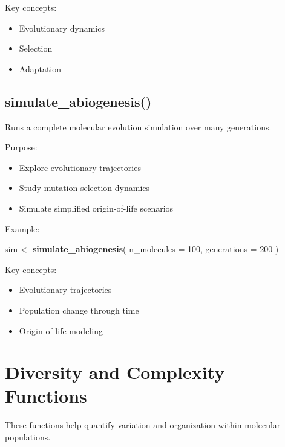 \documentclass[
  oneside,
  openany]{book}
\newenvironment{Shaded}{\begin{snugshade}}{\end{snugshade}}
\newcommand{\AttributeTok}[1]{\textcolor[rgb]{0.13,0.29,0.53}{#1}}
\newcommand{\DecValTok}[1]{\textcolor[rgb]{0.00,0.00,0.81}{#1}}
\newcommand{\FunctionTok}[1]{\textcolor[rgb]{0.13,0.29,0.53}{\textbf{#1}}}
\newcommand{\NormalTok}[1]{#1}
\newcommand{\OtherTok}[1]{\textcolor[rgb]{0.56,0.35,0.01}{#1}}
\providecommand{\tightlist}{%
  \setlength{\itemsep}{0pt}\setlength{\parskip}{0pt}}
\begin{document}
Key concepts:

\begin{itemize}
\tightlist
\item
  Evolutionary dynamics
\item
  Selection
\item
  Adaptation
\end{itemize}

\subsection{simulate\_abiogenesis()}\label{simulate_abiogenesis}

Runs a complete molecular evolution simulation over many generations.

Purpose:

\begin{itemize}
\tightlist
\item
  Explore evolutionary trajectories
\item
  Study mutation-selection dynamics
\item
  Simulate simplified origin-of-life scenarios
\end{itemize}

Example:

\begin{Shaded}
\begin{Highlighting}[]
\NormalTok{sim }\OtherTok{\textless{}{-}} \FunctionTok{simulate\_abiogenesis}\NormalTok{(}
  \AttributeTok{n\_molecules =} \DecValTok{100}\NormalTok{,}
  \AttributeTok{generations =} \DecValTok{200}
\NormalTok{)}
\end{Highlighting}
\end{Shaded}

Key concepts:

\begin{itemize}
\tightlist
\item
  Evolutionary trajectories
\item
  Population change through time
\item
  Origin-of-life modeling
\end{itemize}

\section{Diversity and Complexity Functions}\label{diversity-and-complexity-functions}

These functions help quantify variation and organization within molecular populations.
\end{document}
